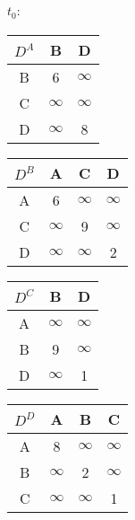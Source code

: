 \documentclass[a4paper]{article}
\begin{document}
\subsection{} 
\paragraph{$t_0:$}
\begin{center}
  \begin{tabular}{|c|c|c|}
    \hline
    $D^A$ & B & D \\ \hline
    B & 6 & $\infty$ \\ \hline
    C & $\infty$ & $\infty$ \\ \hline
    D & $\infty$ & 8 \\
    \hline
  \end{tabular}
  \begin{tabular}{|c|c|c|c|}
    \hline
    $D^B$ & A & C & D \\ \hline
    A & 6 & $\infty$ & $\infty$ \\ \hline
    C & $\infty$ &9 & $\infty$ \\ \hline
    D & $\infty$ & $\infty$ & 2 \\
    \hline
  \end{tabular}
  \begin{tabular}{|c|c|c|}
    \hline
    $D^C$ & B & D \\ \hline
    A & $\infty$ & $\infty$ \\ \hline
    B & 9 & $\infty$ \\ \hline
    D & $\infty$ & 1 \\
    \hline
  \end{tabular}
  \begin{tabular}{|c|c|c|c|}
    \hline
    $D^D$ & A & B & C \\ \hline
    A & 8 & $\infty$ & $\infty$ \\ \hline
    B & $\infty$ &2 & $\infty$ \\ \hline
    C & $\infty$ & $\infty$ & 1 \\
    \hline
  \end{tabular}
\end{center}
\end{document}
